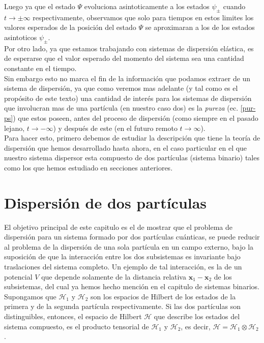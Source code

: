\documentclass[12pt]{book}
\numberwithin{equation}{chapter}
\def\rar{\rightarrow}
\def\H{\mathcal{H}}
\def\pr{\otimes}
\def\x{\mathbf{x}}
\begin{document}
Luego ya que el estado $\Psi$ evoluciona asintoticamente a los estados $\psi_{\pm}$ cuando $t \rar \pm \infty$ respectivamente, observamos que solo para tiempos en estos limites los valores esperados de la posici\'on del estado $\Psi$ se aproximaran a los de los estados asintoticos $\psi_{\pm}$.\\

Por otro lado, ya que estamos trabajando con sistemas de dispersi\'on el\'astica, es de esperarse que el valor esperado del momento del sistema sea una cantidad constante en el tiempo.\\
Sin embargo esto no marca el fin de la informaci\'on que podamos extraer de un sistema de dispersi\'on, ya que como veremos mas adelante (y tal como es el prop\'osito de este texto) una cantidad de inter\'es para los sistemas de dispersi\'on que involucran mas de una part\'icula (en nuestro caso dos) es la \emph{pureza} (ec. \eqref{pur-ps}) que estos poseen, antes del proceso de dispersi\'on (como siempre en el pasado lejano, $t \rar -\infty$) y despu\'es de este (en el futuro remoto $t \rar \infty$).\\
Para hacer esto, primero debemos de estudiar la descripci\'on que tiene la teor\'ia de dispersi\'on que hemos desarrollado hasta ahora, en el caso particular en el que nuestro sistema dispersor esta compuesto de dos part\'iculas (sistema binario) tales como los que hemos estudiado en secciones anteriores.

\newpage

\chapter{Dispersi\'on de dos part\'iculas}
El objetivo principal de este capitulo es el de mostrar que el problema de dispersi\'on para un sistema formado por dos part\'iculas cu\'anticas, se puede reducir al problema de la dispersi\'on de una sola part\'icula en un campo externo, bajo la suposici\'on de que la interacci\'on entre los dos subsistemas es invariante bajo traslaciones del sistema completo. Un ejemplo de tal interacci\'on, es la de un potencial $V$ que depende solamente de la distancia relativa $\x_{1} - \x_{2}$ de los subsistemas, del cual ya hemos hecho menci\'on en el capitulo de sistemas binarios.\\

Supongamos que $\H_{1}$ y $\H_{2}$ son los espacios de Hilbert de los estados de la primera y de la segunda part\'icula respectivamente. Si las dos part\'iculas son distinguibles, entonces, el espacio de Hilbert $\H$ que describe los estados del sistema compuesto, es el producto tensorial de $\H_{1}$ y $\H_{2}$, es decir,  $\H=\H_{1} \pr \H_{2}$.\\
\end{document}
